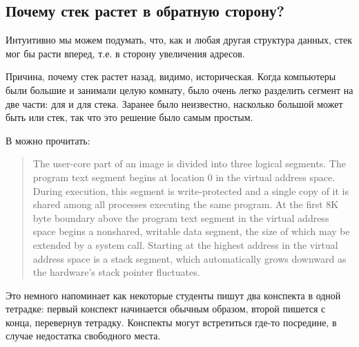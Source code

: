 \subsection{Почему стек растет в обратную сторону?}
\label{stack_grow_backwards}

Интуитивно мы можем подумать, что, как и любая другая структура данных, стек мог бы расти вперед, т.е. в сторону увеличения адресов.

Причина, почему стек растет назад, видимо, историческая.
Когда компьютеры были большие и занимали целую комнату, было очень легко разделить сегмент на две части: для  и для стека.
Заранее было неизвестно, насколько большой может быть  или стек, так что это решение было самым простым.



В \RitchieThompsonUNIX можно прочитать:

\begin{framed}
\begin{quotation}
The user-core part of an image is divided into three logical segments. The program text segment begins at location 0 in the virtual address space. During execution, this segment is write-protected and a single copy of it is shared among all processes executing the same program. At the first 8K byte boundary above the program text segment in the virtual address space begins a nonshared, writable data segment, the size of which may be extended by a system call. Starting at the highest address in the virtual address space is a stack segment, which automatically grows downward as the hardware's stack pointer fluctuates.
\end{quotation}
\end{framed}

Это немного напоминает как некоторые студенты
пишут два конспекта в одной тетрадке:
первый конспект начинается обычным образом, второй пишется с конца, перевернув тетрадку.
Конспекты могут встретиться где-то посредине, в случае недостатка свободного места.


